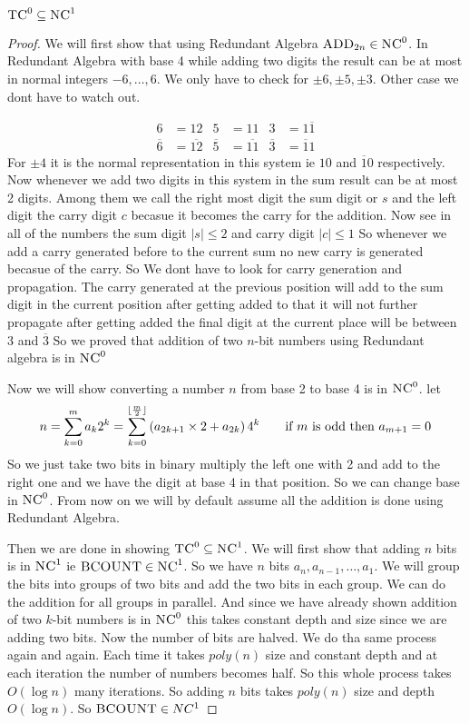 \begin{theorem}
	$\textsc{TC}^0\subseteq \textsc{NC}^1$
\end{theorem}
\begin{proof}
	We will first show that using Redundant Algebra $\textsc{ADD}_{2n}\in \textsc{NC}^0$. In Redundant Algebra with base 4 while adding two digits the result can be at most in normal integers $-6,\dots, 6$. We only have to check for $\pm 6,\pm 5,\pm 3$. Other case we dont have to watch out. 
	
	\begin{align*}
		6&=12 & 5&=11 & 3&=1\overline{1}\\
		\overline{6}&=\overline{12} & \overline{5}&=\overline{11} & \overline{3}&=\overline{1}1
	\end{align*}
	For $\pm 4$ it is the normal representation in this system ie $10$ and $\overline{1}0$ respectively. Now whenever we add two digits in this system in the sum result can be at most 2 digits. Among them we call the right most digit the sum digit or $s$ and the left digit the carry digit $c$ becasue it becomes the carry for the addition. Now see in all of the numbers the sum digit $|s|\leq 2$ and carry digit $|c|\leq 1$ So whenever we add a carry generated before to the current sum no new carry is generated becasue of the carry. So We dont have to look for carry generation and propagation. The carry generated at the previous position will add to the sum digit in the current position after getting added to that it will not further propagate after getting added the final digit at the current place will be between $3$ and $\overline{3}$ So we proved that addition of two $n$-bit numbers using Redundant algebra is in $\textsc{NC}^0$
	
	Now we will show converting a number $n$ from base 2 to base 4 is in $\textsc{NC}^0$. let $$n=\sum_{k=0}^{m}a_k2^k=\sum_{k=0}^{\lfloor \frac{m}2\rfloor}\left(a_{2k+1}\times 2+a_{2k}\right)4^k\qquad \text{if }m\text{ is odd then } a_{m+1}=0$$ So we just take two bits in binary multiply the left one with 2 and add to the right one and we have the digit at base 4 in that position. So we can change base in $\textsc{NC}^0$. From now on we will by default assume all the addition is done using Redundant Algebra.
	
	Then we are done in showing $\textsc{TC}^0\subseteq \textsc{NC}^1$. We will first show that adding $n$ bits is in $\textsc{NC}^1$ ie $\textsc{BCOUNT}\in \textsc{NC}^1$. So we have $n$ bits $a_n,a_{n-1},\dots, a_1$. We will group the bits into groups of two bits and add the two bits in each group. We can do the addition for all groups in parallel. And since we have already shown addition of two $k$-bit numbers is in $\textsc{NC}^0$ this takes constant depth and size since we are adding two bits. Now the number of bits are halved. We do tha same process again and again. Each time it takes $poly(n)$ size and constant depth and at each iteration the number of numbers becomes half. So this whole process takes $O(\log n)$ many iterations. So adding $n$ bits takes $poly(n)$ size and depth $O(\log n)$. So $\textsc{BCOUNT}\in NC^1$
	

\end{proof}
